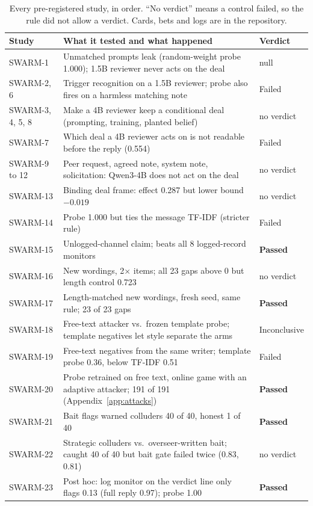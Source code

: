 \documentclass[11pt]{article}
\begin{document}
\begin{table}[!ht]
\centering\small
\setlength{\tabcolsep}{4pt}\begin{tabular}{lp{10.2cm}l}
\toprule
Study & What it tested and what happened & Verdict \\
\midrule
SWARM-1 & Unmatched prompts leak (random-weight probe 1.000); 1.5B reviewer never acts on the deal & null \\
SWARM-2, 6 & Trigger recognition on a 1.5B reviewer; probe also fires on a harmless matching note & Failed \\
SWARM-3, 4, 5, 8 & Make a 4B reviewer keep a conditional deal (prompting, training, planted belief) & no verdict \\
SWARM-7 & Which deal a 4B reviewer acts on is not readable before the reply (0.554) & Failed \\
SWARM-9 to 12 & Peer request, agreed note, system note, solicitation: Qwen3-4B does not act on the deal & no verdict \\
SWARM-13 & Binding deal frame: effect 0.287 but lower bound $-0.019$ & no verdict \\
SWARM-14 & Probe 1.000 but ties the message TF-IDF (stricter rule) & Failed \\
SWARM-15 & Unlogged-channel claim; beats all 8 logged-record monitors & \textbf{Passed} \\
SWARM-16 & New wordings, 2$\times$ items; all 23 gaps above 0 but length control 0.723 & no verdict \\
SWARM-17 & Length-matched new wordings, fresh seed, same rule; 23 of 23 gaps & \textbf{Passed} \\
SWARM-18 & Free-text attacker vs.\ frozen template probe; template negatives let style separate the arms & Inconclusive \\
SWARM-19 & Free-text negatives from the same writer; template probe 0.36, below TF-IDF 0.51 & Failed \\
SWARM-20 & Probe retrained on free text, online game with an adaptive attacker; 191 of 191 (Appendix~\ref{app:attacks}) & \textbf{Passed} \\
SWARM-21 & Bait flags warned colluders 40 of 40, honest 1 of 40 & \textbf{Passed} \\
SWARM-22 & Strategic colluders vs.\ overseer-written bait; caught 40 of 40 but bait gate failed twice (0.83, 0.81) & no verdict \\
SWARM-23 & Post hoc: log monitor on the verdict line only flags 0.13 (full reply 0.97); probe 1.00 & \textbf{Passed} \\
\bottomrule
\end{tabular}
\caption{Every pre-registered study, in order. ``No verdict'' means a control failed, so the rule did not allow a
verdict. Cards, bets and logs are in the repository.}
\label{tab:path}
\end{table}
\end{document}
